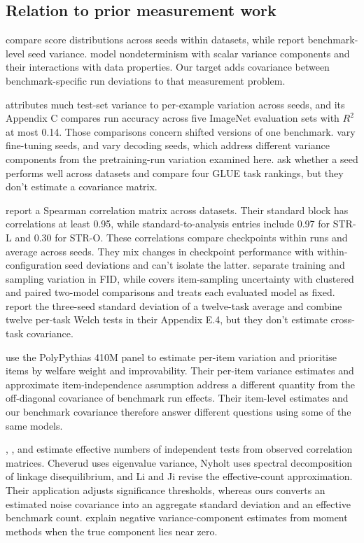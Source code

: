 \subsection{Relation to prior measurement work}
\citet{reimers2017} compare score distributions across seeds within datasets, while \citet{madaan2024} report benchmark-level seed variance. \citet{hagmann2023} model nondeterminism with scalar variance components and their interactions with data properties. Our target adds covariance between benchmark-specific run deviations to that measurement problem.

\citet{jordan2024} attributes much test-set variance to per-example variation across seeds, and its Appendix C compares run accuracy across five ImageNet evaluation sets with $R^2$ at most 0.14. Those comparisons concern shifted versions of one benchmark. \citet{bui2025} vary fine-tuning seeds, and \citet{hochlehnert2025} vary decoding seeds, which address different variance components from the pretraining-run variation examined here. \citet[Section 4.3]{dodge2020} ask whether a seed performs well across datasets and compare four GLUE task rankings, but they don't estimate a covariance matrix.

\citet[Figure 3]{zhou2020} report a Spearman correlation matrix across datasets. Their standard block has correlations at least 0.95, while standard-to-analysis entries include 0.97 for STR-L and 0.30 for STR-O. These correlations compare checkpoints within runs and average across seeds. They mix changes in checkpoint performance with within-configuration seed deviations and can't isolate the latter. \citet{dufour2026} separate training and sampling variation in FID, while \citet{miller2024} covers item-sampling uncertainty with clustered and paired two-model comparisons and treats each evaluated model as fixed. \citet{zhao2026} report the three-seed standard deviation of a twelve-task average and combine twelve per-task Welch tests in their Appendix E.4, but they don't estimate cross-task covariance.

\citet{haupt2026} use the PolyPythias 410M panel to estimate per-item variation and prioritise items by welfare weight and improvability. Their per-item variance estimates and approximate item-independence assumption address a different quantity from the off-diagonal covariance of benchmark run effects. Their item-level estimates and our benchmark covariance therefore answer different questions using some of the same models.

\citet{cheverud2001}, \citet{nyholt2004}, and \citet{li2005} estimate effective numbers of independent tests from observed correlation matrices. Cheverud uses eigenvalue variance, Nyholt uses spectral decomposition of linkage disequilibrium, and Li and Ji revise the effective-count approximation. Their application adjusts significance thresholds, whereas ours converts an estimated noise covariance into an aggregate standard deviation and an effective benchmark count. \citet{searle1992} explain negative variance-component estimates from moment methods when the true component lies near zero.

